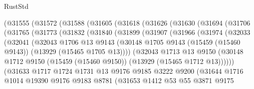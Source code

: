 \begin{lexlean}{RustStd}
\begin{coremodule}
    (@31555
      (@31572
        (@31588
          (@31605
            (@31618
              (@31626
                (@31630
                  (@31694
                    (@31706
                      (@31765
                        (@31773
                          (@31832
                            (@31840
                              (@31899
                                (@31907
                                  (@31966
                                    (@31974
                                      (@32033
                                        (@32041
                                          (@32043
                                            @1706
                                            @13
                                            @9143
                                            (@30148
                                              @1705
                                              @9143
                                              (@15459 (@15460 @9143))
                                              (@13929 (@15465 @1705 @13))))
                                          (@32043
                                            @1713
                                            @13
                                            @9150
                                            (@30148
                                              @1712
                                              @9150
                                              (@15459 (@15460 @9150))
                                              (@13929 (@15465 @1712 @13))))))
                                      (@31633
                                        @1717
                                        @1724
                                        @1731
                                        @13
                                        @9176
                                        @9185
                                        @3222
                                        @9200
                                        (@31644
                                          @1716
                                          @1014
                                          @19390
                                          @9176
                                          @9183
                                          @8781
                                          (@31653
                                            @1412
                                            @53
                                            @55
                                            @3871
                                            @9175

\end{coremodule}
\end{lexlean}
